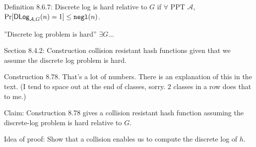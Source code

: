 \documentclass[12pt]{article}
\newcommand{\AAA}{\mathcal{A}}
\newcommand{\ExptDLogArgs}[2]{\mathsf{DLog}_{#1,#2}}
\newcommand{\ExptDLog}{\ExptDLogArgs{\AAA}{G}}
\newcommand{\negl}{{\tt negl}}
\begin{document}
Definition 8.6.7: Discrete log is hard relative to $G$ if $\forall$ PPT $\AAA$, $\Pr[\ExptDLog(n)=1]\leq\negl(n)$.

''Discrete log problem is hard'' $\exists G$...

Section 8.4.2: Construction collision resistant hash functions given that we assume the discrete log problem is hard.

Construction 8.78. That's a lot of numbers. There is an explanation of this in the text. (I tend to space out at the end of classes, sorry. 2 classes in a row does that to me.)

Claim: Construction 8.78 gives a collision resistant hash function assuming the discrete-log problem is hard relative to $G$.

Idea of proof: Show that a collision enables us to compute the discrete log of $h$.
\end{document}
